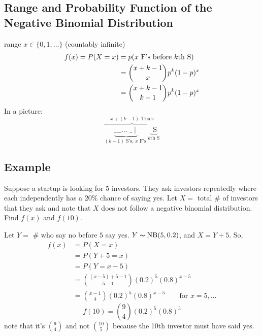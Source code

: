\subsection{Range and Probability Function of the Negative Binomial Distribution}
range $ x\in\{0,1,\dots\} $ (countably infinite)
\begin{align*}
    f(x)=P(X=x)
    &=p(x\text{ F's before $ k $th S})\\
    &=\binom{x+k-1}{x}p^k(1-p)^x\\
    &=\binom{x+k-1}{k-1}p^k(1-p)^x
\end{align*}
In a picture:
\[\overbrace{\underbrace{\text{\_ \_ \_ $\ldots$ \_}\mid}_
{(k-1) \text{ S's, }x \text{ F's }}
\underbrace{\text{ S}}_{k\text{th S}}}^{x+(k-1)\text{ Trials}}\]

\subsection{Example}
Suppose a startup is looking for $ 5 $ investors. They ask
investors repeatedly where each independently has a $ 20\% $ chance
of saying yes. Let $ X= $ total \# of investors that they ask and
note that $ X $ does not follow a negative binomial distribution.
Find $ f(x) $ and $ f(10) $.

Let $ Y= $ \# who say no before $ 5 $ say yes.
$ Y\thicksim\operatorname{NB}(5,0.2) $, and $ X=Y+5 $. So,
\begin{align*}
    f(x)&=P(X=x)\\
    &=P(Y+5=x)\\
    &=P(Y=x-5)\\
    &=\binom{(x-5)+5-1}{5-1}(0.2)^5(0.8)^{x-5}\\
    &=\binom{x-1}{4}(0.2)^5(0.8)^{x-5} \qquad \text{for } x=5,\ldots
\end{align*}
\[ f(10)=\binom{9}{4}(0.2)^5(0.8)^5 \]
note that it's $ \binom{9}{4} $ and not $ \binom{10}{5} $ because
the 10th investor must have said yes.